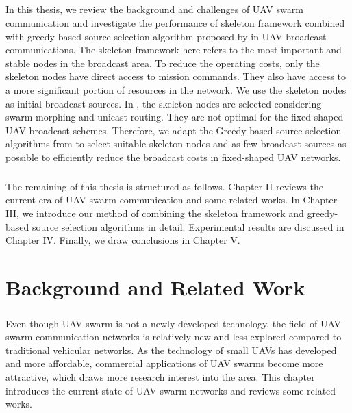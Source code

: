 \documentclass[a4paper,12pt]{report}
\begin{document}
\paragraph{}
In this thesis, we review the background and challenges of UAV swarm communication and investigate the performance of skeleton framework\cite{ssr} combined with greedy-based source selection algorithm proposed by \cite{prose} in UAV broadcast communications. The skeleton framework here refers to the most important and stable nodes in the broadcast area. To reduce the operating costs, only the skeleton nodes have direct access to mission commands. They also have access to a more significant portion of resources in the network\cite{ssr}. We use the skeleton nodes as initial broadcast sources. In \cite{ssr}, the skeleton nodes are selected considering swarm morphing and unicast routing. They are not optimal for the fixed-shaped UAV broadcast schemes. Therefore, we adapt the Greedy-based source selection algorithms from \cite{prose} to select suitable skeleton nodes and as few broadcast sources as possible to efficiently reduce the broadcast costs in fixed-shaped UAV networks.

\paragraph{}
The remaining of this thesis is structured as follows. Chapter II reviews the current era of UAV swarm communication and some related works. In Chapter III, we introduce our method of combining the skeleton framework and greedy-based source selection algorithms in detail. Experimental results are discussed in Chapter IV. Finally, we draw conclusions in Chapter V.

\chapter{Background and Related Work}
\paragraph{}
Even though UAV swarm is not a newly developed technology, the field of UAV swarm communication networks is relatively new and less explored compared to traditional vehicular networks. As the technology of small UAVs has developed and more affordable, commercial applications of UAV swarms become more attractive, which draws more research interest into the area. This chapter introduces the current state of UAV swarm networks and reviews some related works.
\end{document}
